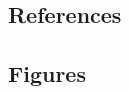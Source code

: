 \documentclass[
]{article}
\newlength{\cslhangindent}
\newlength{\cslentryspacingunit} %
\newenvironment{CSLReferences}[2] %
 {%
  \setlength{\parindent}{0pt}
  \ifodd #1
  \let\oldpar\par
  \def\par{\hangindent=\cslhangindent\oldpar}
  \fi
  \setlength{\parskip}{#2\cslentryspacingunit}
 }%
 {}
\begin{document}
\newpage

\hypertarget{references}{%
\subsection{References}\label{references}}

\setlength{\parindent}{-0.25in}
\setlength{\leftskip}{0.25in}

\noindent

\hypertarget{refs}{}
\begin{CSLReferences}{0}{0}
\end{CSLReferences}


\setlength{\parindent}{0in}
\setlength{\leftskip}{0in}

\newpage

\hypertarget{figures}{%
\subsection{Figures}\label{figures}}
\end{document}
